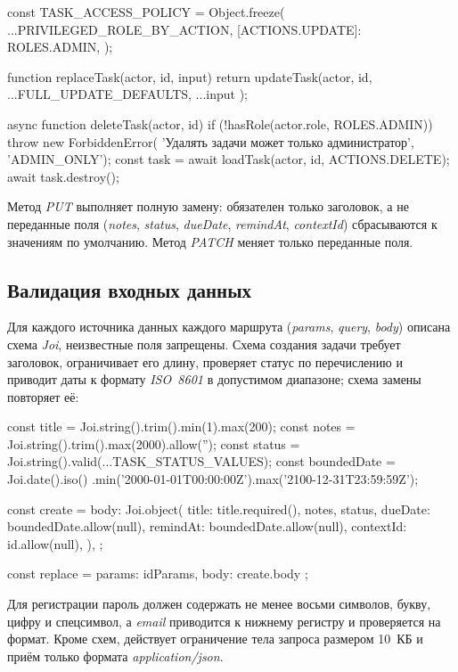 \documentclass{stp}
\newcommand{\en}[1]{\textit{#1}}
\begin{document}
\begin{stplisting}
const TASK_ACCESS_POLICY = Object.freeze({
  ...PRIVILEGED_ROLE_BY_ACTION,
  [ACTIONS.UPDATE]: ROLES.ADMIN,
});

function replaceTask(actor, id, input) {
  return updateTask(actor, id,
    { ...FULL_UPDATE_DEFAULTS, ...input });
}

async function deleteTask(actor, id) {
  if (!hasRole(actor.role, ROLES.ADMIN)) {
    throw new ForbiddenError(
      'Удалять задачи может только администратор',
      'ADMIN_ONLY');
  }
  const task = await loadTask(actor, id, ACTIONS.DELETE);
  await task.destroy();
}
\end{stplisting}

Метод \en{PUT} выполняет полную замену: обязателен только заголовок, а не
переданные поля (\en{notes}, \en{status}, \en{dueDate}, \en{remindAt},
\en{contextId}) сбрасываются к значениям по умолчанию. Метод \en{PATCH}
меняет только переданные поля.

\subsection{Валидация входных данных}

Для каждого источника данных каждого маршрута (\en{params}, \en{query},
\en{body}) описана схема \en{Joi}, неизвестные поля запрещены. Схема
создания задачи требует заголовок, ограничивает его длину, проверяет
статус по перечислению и приводит даты к формату \en{ISO~8601} в
допустимом диапазоне; схема замены повторяет её:

\begin{stplisting}
const title = Joi.string().trim().min(1).max(200);
const notes = Joi.string().trim().max(2000).allow('');
const status = Joi.string().valid(...TASK_STATUS_VALUES);
const boundedDate = Joi.date().iso()
  .min('2000-01-01T00:00:00Z').max('2100-12-31T23:59:59Z');

const create = {
  body: Joi.object({
    title: title.required(),
    notes,
    status,
    dueDate: boundedDate.allow(null),
    remindAt: boundedDate.allow(null),
    contextId: id.allow(null),
  }),
};

const replace = { params: idParams, body: create.body };
\end{stplisting}

Для регистрации пароль должен содержать не менее восьми символов, букву,
цифру и спецсимвол, а \en{email} приводится к нижнему регистру и
проверяется на формат. Кроме схем, действует ограничение тела запроса
размером 10~КБ и приём только формата \en{application/json}.
\end{document}
